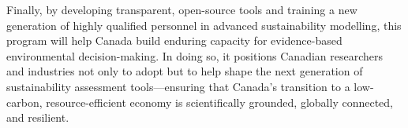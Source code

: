 \documentclass[compact]{nserc} %
\begin{document}
\begin{markdown}
Finally, by developing transparent, open-source tools and training a new generation of highly qualified personnel in advanced sustainability modelling, this program will help Canada build enduring capacity for evidence-based environmental decision-making. In doing so, it positions Canadian researchers and industries not only to adopt but to help shape the next generation of sustainability assessment tools—ensuring that Canada’s transition to a low-carbon, resource-efficient economy is scientifically grounded, globally connected, and resilient.

\end{markdown}

\pagebreak
\setcounter{page}{1}
\begingroup
\setlength\bibitemsep{0pt}
\printbibliography
\endgroup
\end{document}
